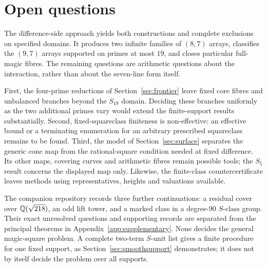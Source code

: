 \section{Open questions}\label{sec:program}

The difference-side approach yields both constructions and complete
exclusions on specified domains. It produces two infinite families of
$(8,7)$ arrays, classifies the $(9,7)$ arrays supported on primes at most
$19$, and closes particular full-magic fibres. The remaining questions
are arithmetic questions about the interaction, rather than about the
seven-line form itself.

First, the four-prime reductions of Section~\ref{sec:frontier} leave fixed
core fibres and unbalanced branches beyond the $S_{19}$ domain. Deciding
these branches uniformly as the two additional primes vary would extend
the finite-support results substantially. Second, fixed-squareclass
finiteness is non-effective: an effective bound or a terminating
enumeration for an arbitrary prescribed squareclass remains to be found.
Third, the model of Section~\ref{sec:surface} separates the generic cone
map from the rational-square condition needed at fixed difference. Its
other maps, covering curves and arithmetic fibres remain possible tools;
the $S_5$ result concerns the displayed map only. Likewise, the finite-class
countercertificate leaves methods using representatives, heights and
valuations available.

The companion repository records three further continuations: a residual
cover over $\mathbb{Q}(\sqrt{218})$, an odd lift tower, and a marked class in a
degree-$90$ $S$-class group. Their exact unresolved questions and supporting
records are separated from the principal theorems in
Appendix~\ref{app:supplementary}. None decides the general magic-square
problem. A complete two-term $S$-unit list gives a finite procedure for
one fixed support, as Section~\ref{sec:smoothsupport} demonstrates; it does
not by itself decide the problem over all supports.
